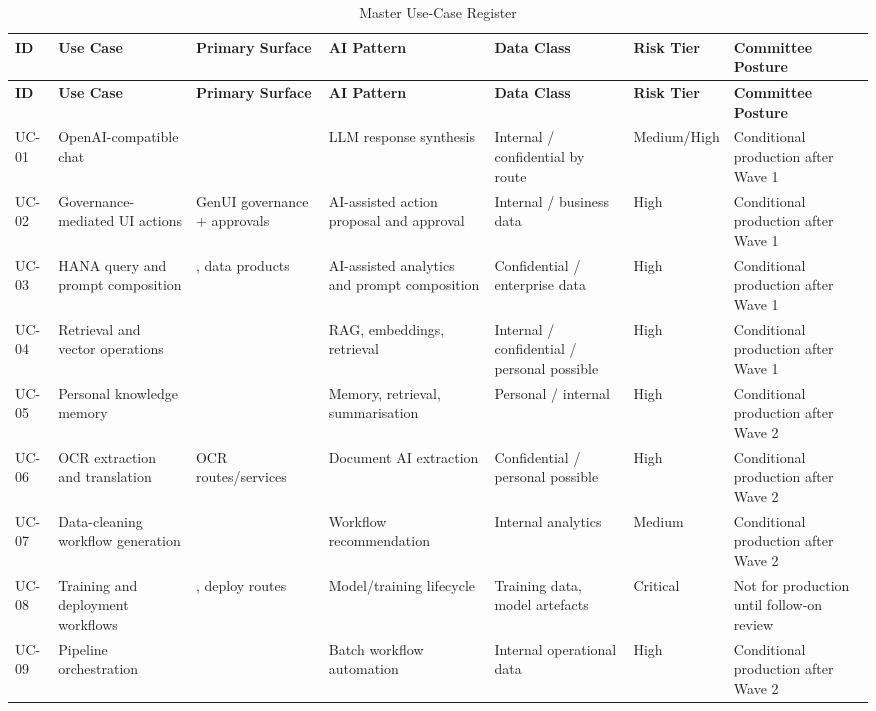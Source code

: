 \documentclass[11pt,a4paper]{article}
\begin{document}
\renewcommand{\arraystretch}{1.05}
\begin{longtable}{P{0.07\textwidth}P{0.17\textwidth}P{0.16\textwidth}P{0.12\textwidth}P{0.12\textwidth}P{0.12\textwidth}P{0.14\textwidth}}
\caption{Master Use-Case Register} \\
\toprule
\textbf{ID} & \textbf{Use Case} & \textbf{Primary Surface} & \textbf{AI Pattern} & \textbf{Data Class} & \textbf{Risk Tier} & \textbf{Committee Posture} \\
\midrule
\endfirsthead
\toprule
\textbf{ID} & \textbf{Use Case} & \textbf{Primary Surface} & \textbf{AI Pattern} & \textbf{Data Class} & \textbf{Risk Tier} & \textbf{Committee Posture} \\
\midrule
\endhead
UC-01 & OpenAI-compatible chat &  & LLM response synthesis & Internal / confidential by route & Medium/High & Conditional production after Wave 1 \\
UC-02 & Governance-mediated UI actions & GenUI governance + approvals & AI-assisted action proposal and approval & Internal / business data & High & Conditional production after Wave 1 \\
UC-03 & HANA query and prompt composition & , data products & AI-assisted analytics and prompt composition & Confidential / enterprise data & High & Conditional production after Wave 1 \\
UC-04 & Retrieval and vector operations &  & RAG, embeddings, retrieval & Internal / confidential / personal possible & High & Conditional production after Wave 1 \\
UC-05 & Personal knowledge memory &  & Memory, retrieval, summarisation & Personal / internal & High & Conditional production after Wave 2 \\
UC-06 & OCR extraction and translation & OCR routes/services & Document AI extraction & Confidential / personal possible & High & Conditional production after Wave 2 \\
UC-07 & Data-cleaning workflow generation &  & Workflow recommendation & Internal analytics & Medium & Conditional production after Wave 2 \\
UC-08 & Training and deployment workflows & , deploy routes & Model/training lifecycle & Training data, model artefacts & Critical & Not for production until follow-on review \\
UC-09 & Pipeline orchestration &  & Batch workflow automation & Internal operational data & High & Conditional production after Wave 2 \\

\end{longtable}
\end{document}
